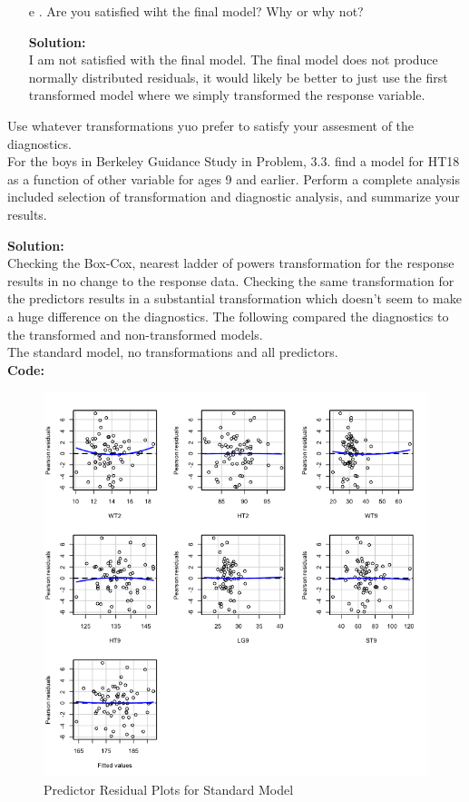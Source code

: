 \documentclass[12pt]{article}
\makeatletter
\theoremstyle{homework}
\newenvironment{exercise}[1]
{\def\@currentlabel{#1}\exercisecore}
{\endexercisecore}
\newcommand{\localhead}[1]{\par\smallskip\noindent\textbf{#1}\nobreak\\}%
\newcommand\solution{\localhead{Solution:}}
\makeatother
\begin{document}
\begin{exercise}{1}
\begin{enumerate}
      \item[e]. Are you satisfied wiht the final model? Why or why not?\\
      \solution I am not satisfied with the final model. The final model does not produce normally distributed residuals, it would likely be 
      better to just use the first transformed model where we simply transformed the response variable.  
  \end{enumerate}
\end{exercise}
\newpage

\begin{exercise}{10.4} Use whatever transformations yuo prefer to satisfy your assesment of the diagnostics.\\
  For the boys in Berkeley Guidance Study in Problem, 3.3. find a model for HT18 as a function of other variable for ages 9 
  and earlier. Perform a complete analysis included selection of transformation and diagnostic analysis, and summarize your results. \\
  \solution Checking the Box-Cox, nearest ladder of powers transformation for the response results in no change to the response data. Checking the 
  same transformation for the predictors results in a substantial transformation which doesn't seem to make a huge difference on the diagnostics.
  The following compared the diagnostics to the transformed and non-transformed models.\\
  The standard model, no transformations and all predictors. \\
  \textbf{Code:}
  \begin{center}
  
  \end{center} 
  \begin{figure}[H]
    \begin{center}
    \caption{Predictor Residual Plots for Standard Model}
    \includegraphics[width = \textwidth]{ResidualPlotsModel.png}

\end{center}
\end{figure}
\end{exercise}
\end{document}
